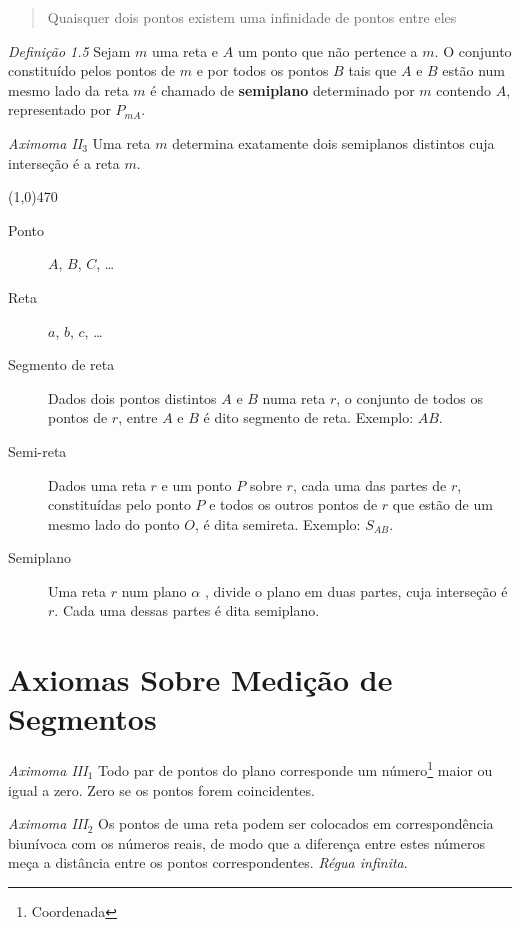 \documentclass[11pt]{article}
\begin{document}
\begin{quote}
  Quaisquer dois pontos existem uma infinidade de pontos entre eles
\end{quote}

\emph{Definição 1.5} Sejam $m$ uma reta e $A$ um ponto que não pertence a
$m$. O conjunto constituído pelos pontos de $m$ e por todos os pontos $B$ tais
que $A$ e $B$ estão num mesmo lado da reta $m$ é chamado de \textbf{semiplano}
determinado por $m$ contendo $A$, representado por $P_{mA}$.

\emph{Aximoma II$_{3}$} Uma reta $m$ determina exatamente dois semiplanos distintos
cuja interseção é a reta $m$.

\line(1,0){470}

\begin{description}
  \item[Ponto] $A$, $B$, $C$, \ldots

  \item[Reta] $a$, $b$, $c$, \ldots

  \item[Segmento de reta]
  Dados dois pontos distintos $A$ e $B$ numa reta $r$, o conjunto de todos os
  pontos de $r$, entre $A$ e $B$ é dito segmento de reta. Exemplo: $AB$.

  \item[Semi-reta]
  Dados uma reta $r$ e um ponto $P$ sobre $r$, cada uma das partes de $r$,
  constituídas pelo ponto $P$ e todos os outros pontos de $r$ que estão de um
  mesmo lado do ponto $O$, é dita semireta. Exemplo: $S_{AB}$.

  \item[Semiplano]
  Uma reta $r$ num plano $\alpha$ , divide o plano em duas partes, cuja
  interseção é $r$. Cada uma dessas partes é dita semiplano.
\end{description}

\section{Axiomas Sobre Medição de Segmentos}

\emph{Aximoma III$_{1}$} Todo par de pontos do plano corresponde um
número\footnote{Coordenada} maior ou igual a zero. Zero se os pontos forem
coincidentes.

\emph{Aximoma III$_{2}$} Os pontos de uma reta podem ser colocados em
correspondência biunívoca com os números reais, de modo que a diferença entre
estes números meça a distância entre os pontos correspondentes. \emph{Régua
infinita}.
\end{document}

